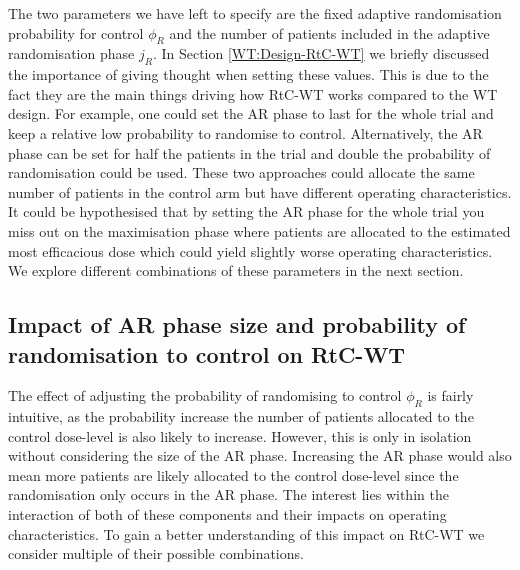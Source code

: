 The two parameters we have left to specify are the fixed adaptive randomisation probability for control $\phi_R$ and the number of patients included in the adaptive randomisation phase $j_R$. In Section \ref{WT:Design-RtC-WT} we briefly discussed the importance of giving thought when setting these values. This is due to the fact they are the main things driving how RtC-WT works compared to the WT design. For example, one could set the AR phase to last for the whole trial and keep a relative low probability to randomise to control. Alternatively, the AR phase can be set for half the patients in the trial and double the probability of randomisation could be used. These two approaches could allocate the same number of patients in the control arm but have different operating characteristics. It could be hypothesised that by setting the AR phase for the whole trial you miss out on the maximisation phase where patients are allocated to the estimated most efficacious dose which could yield slightly worse operating characteristics. We explore different combinations of these parameters in the next section. 


\subsection{Impact of AR phase size and probability of randomisation to control on RtC-WT}
\label{WT:Impact-ARandRTCon-RtC-WT}


The effect of adjusting the probability of randomising to control $\phi_R$ is fairly intuitive, as the probability increase the number of patients allocated to the control dose-level is also likely to increase. However, this is only in isolation without considering the size of the AR phase. Increasing the AR phase would also mean more patients are likely allocated to the control dose-level since the randomisation only occurs in the AR phase. The interest lies within the interaction of both of these components and their impacts on operating characteristics. To gain a better understanding of this impact on RtC-WT we consider multiple of their possible combinations. 


